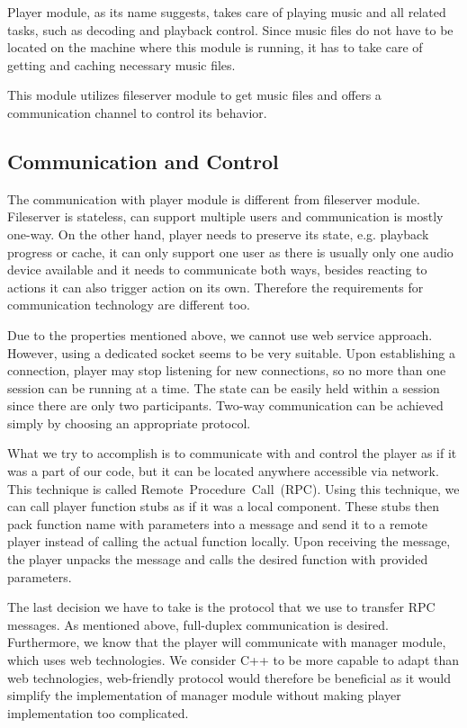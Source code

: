 Player module, as its name suggests, takes care of playing music and all related tasks, such as decoding and playback control. Since music files do not have to be located on the machine where this module is running, it has to take care of getting and caching necessary music files.
\par
This module utilizes fileserver module to get music files and offers a communication channel to control its behavior.

\subsection{Communication and Control}

The communication with player module is different from fileserver module. Fileserver is stateless, can support multiple users and communication is mostly one-way. On the other hand, player needs to preserve its state, e.g. playback progress or cache, it can only support one user as there is usually only one audio device available and it needs to communicate both ways, besides reacting to actions it can also trigger action on its own. Therefore the requirements for communication technology are different too.
\par
Due to the properties mentioned above, we cannot use web service approach. However, using a dedicated socket seems to be very suitable. Upon establishing a connection, player may stop listening for new connections, so no more than one session can be running at a time. The state can be easily held within a session since there are only two participants. Two-way communication can be achieved simply by choosing an appropriate protocol.
\par
What we try to accomplish is to communicate with and control the player as if it was a part of our code, but it can be located anywhere accessible via network. This technique is called Remote~Procedure~Call~(RPC). Using this technique, we can call player function stubs as if it was a local component. These stubs then pack function name with parameters into a message and send it to a remote player instead of calling the actual function locally. Upon receiving the message, the player unpacks the message and calls the desired function with provided parameters.
\par
The last decision we have to take is the protocol that we use to transfer RPC messages. As mentioned above, full-duplex communication is desired. Furthermore, we know that the player will communicate with manager module, which uses web technologies. We consider C++ to be more capable to adapt than web technologies, web-friendly protocol would therefore be beneficial as it would simplify the implementation of manager module without making player implementation too complicated.
